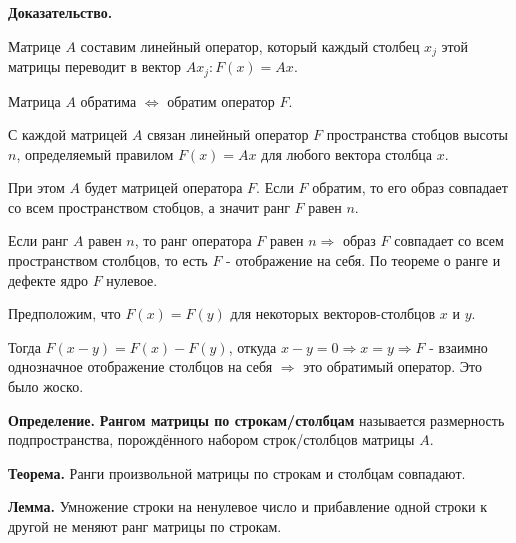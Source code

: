 \documentclass[a4paper]{article}
\begin{document}
\begin{hproof}
\textbf{Доказательство.}

Матрице $A$ составим линейный оператор, который каждый столбец $x_j$ этой матрицы переводит в вектор $Ax_j: F(x) = Ax$.

Матрица $A$ обратима $\Leftrightarrow$ обратим оператор $F$.

С каждой матрицей $A$ связан линейный оператор $F$ пространства стобцов высоты $n$, определяемый правилом $F(x) = Ax$ для любого вектора столбца $x$.

При этом $A$ будет матрицей оператора $F$. Если $F$ обратим, то его образ совпадает со всем пространством стобцов, а значит ранг $F$ равен $n$.

Если ранг $A$ равен $n$, то ранг оператора $F$ равен $n \Rightarrow$ образ $F$ совпадает со всем пространством столбцов, то есть $F$ - отображение на себя. По теореме о ранге и дефекте ядро $F$ нулевое.

Предположим, что $F(x) = F(y)$ для некоторых векторов-столбцов $x$ и $y$.

Тогда $F(x-y) = F(x) - F(y)$, откуда $x-y=0 \Rightarrow x=y \Rightarrow F$ - взаимно однозначное отображение столбцов на себя $\Rightarrow$ это обратимый оператор. Это было жоско.
\end{hproof}

\textbf{Определение.} \textbf{Рангом матрицы по строкам/столбцам} называется размерность подпространства, порождённого набором строк/столбцов матрицы $A$.

\begin{htheorem}
\textbf{Теорема.} Ранги произвольной матрицы по строкам и столбцам совпадают.
\end{htheorem}

\begin{htheorem}
\textbf{Лемма.} Умножение строки на ненулевое число и прибавление одной строки к другой не меняют ранг матрицы по строкам.
\end{htheorem}
\end{document}
